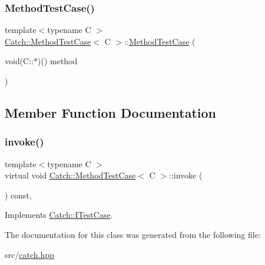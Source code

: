 \subsubsection{\texorpdfstring{Method\+Test\+Case()}{MethodTestCase()}}
{\footnotesize\ttfamily template$<$typename C $>$ \\
\hyperlink{class_catch_1_1_method_test_case}{Catch\+::\+Method\+Test\+Case}$<$ C $>$\+::\hyperlink{class_catch_1_1_method_test_case}{Method\+Test\+Case} (\begin{DoxyParamCaption}\item[{void(C\+::$\ast$)()}]{method }\end{DoxyParamCaption})\hspace{0.3cm}{\ttfamily [inline]}}



\subsection{Member Function Documentation}
\mbox{\label{class_catch_1_1_method_test_case_a4e2263cfa0646f2980768328cb372793}} 
\subsubsection{\texorpdfstring{invoke()}{invoke()}}
{\footnotesize\ttfamily template$<$typename C $>$ \\
virtual void \hyperlink{class_catch_1_1_method_test_case}{Catch\+::\+Method\+Test\+Case}$<$ C $>$\+::invoke (\begin{DoxyParamCaption}{ }\end{DoxyParamCaption}) const\hspace{0.3cm}{\ttfamily [inline]}, {\ttfamily [virtual]}}



Implements \hyperlink{struct_catch_1_1_i_test_case_a678825e62e7c17297621cfeb65588c34}{Catch\+::\+I\+Test\+Case}.



The documentation for this class was generated from the following file\+:\begin{DoxyCompactItemize}
\item 
src/\hyperlink{catch_8hpp}{catch.\+hpp}\end{DoxyCompactItemize}
